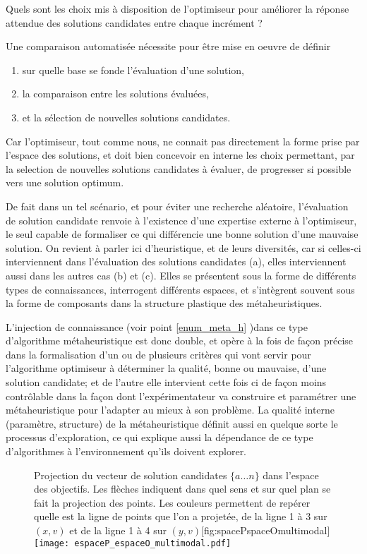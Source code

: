 Quels sont les choix mis à disposition de l'optimiseur pour améliorer la réponse attendue des solutions candidates entre chaque incrément ? \autocite[19]{Weise2011}

Une comparaison automatisée nécessite pour être mise en oeuvre de définir \begin{enumerate}[label=(\alph*)]
\item sur quelle base se fonde l'évaluation d'une solution,
\item la comparaison entre les solutions évaluées,
\item et la sélection de nouvelles solutions candidates.\end{enumerate} 

Car l'optimiseur, tout comme nous, ne connait pas directement la forme prise par l'espace des solutions, et doit bien concevoir en interne les choix permettant, par la selection de nouvelles solutions candidates à évaluer, de progresser si possible vers une solution optimum.

De fait dans un tel scénario, et pour éviter une recherche aléatoire, l'évaluation de solution candidate renvoie à l'existence d'une expertise externe à l'optimiseur, le seul capable de formaliser ce qui différencie une bonne solution d'une mauvaise solution. On revient à parler ici d'heuristique, et de leurs diversités, car si celles-ci interviennent dans l'évaluation des solutions candidates (a), elles interviennent aussi dans les autres cas (b) et (c). Elles se présentent sous la forme de différents types de connaissances, interrogent différents espaces, et s'intègrent souvent sous la forme de composants dans la structure plastique des métaheuristiques.

L'injection de connaissance (voir point \ref{enum_meta_h} )dans ce type d'algorithme métaheuristique est donc double, et opère à la fois de façon précise dans la formalisation d'un ou de plusieurs critères qui vont servir pour l'algorithme optimiseur à déterminer la qualité, bonne ou mauvaise, d'une solution candidate; et de l'autre elle intervient cette fois ci de façon moins contrôlable dans la façon dont l'expérimentateur va construire et paramétrer une métaheuristique pour l'adapter au mieux à son problème. La qualité interne (paramètre, structure) de la métaheuristique définit aussi en quelque sorte le processus d'exploration, ce qui explique aussi la dépendance de ce type d'algorithmes à l'environnement qu'ils doivent explorer.

\begin{figure}[htb]
	\begin{sidecaption}[fortoc]{Projection du vecteur de solution candidates $\{a \dotsc n\}$ dans l'espace des objectifs. Les flèches indiquent dans quel sens et sur quel plan se fait la projection des points. Les couleurs permettent de repérer quelle est la ligne de points que l'on a projetée, de la ligne 1 à 3 sur $(x,v)$ et de la ligne 1 à 4 sur $(y,v)$}[fig:spacePspaceOmultimodal]
	 \centering
	 	\texttt{[image: espaceP\_espaceO\_multimodal.pdf]}
	\end{sidecaption}
\end{figure}


